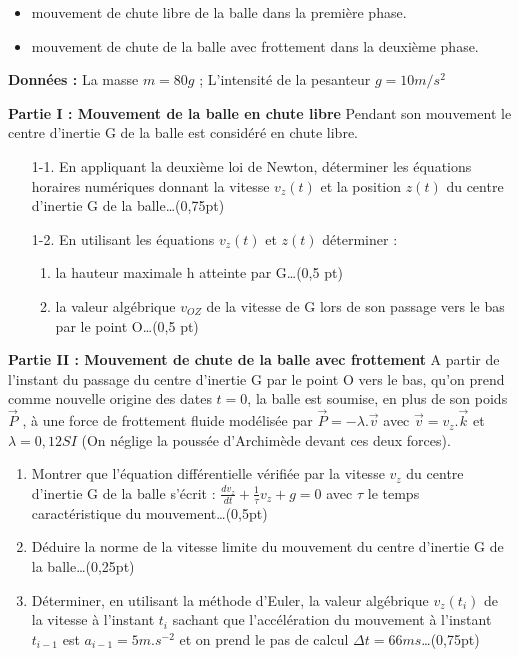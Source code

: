 \documentclass[12pt]{article}
\begin{document}
\begin{itemize}
  \item mouvement de chute libre de la balle dans la première phase.
  \item mouvement de chute de la balle avec frottement dans la deuxième phase.
\end{itemize}

\textbf{Données : }La masse $m = 80g$ ; L’intensité de la pesanteur $g = 10 m/s^2$

\textbf{Partie I : Mouvement de la balle en chute libre}
Pendant son mouvement le centre d’inertie G de la balle est considéré en chute libre.

\begin{enumerate}
  \item[1-1.] En appliquant la deuxième loi de Newton, déterminer les équations horaires
   numériques donnant la vitesse $v_z(t)$ et la position $z(t)$ du centre d'inertie G de la balle\dots(0,75pt)

  \item[1-2.] En utilisant les équations $v_z(t)$ et $z(t)$ déterminer :
    \begin{enumerate}
      \item la hauteur maximale h atteinte par G\dots(0,5 pt)
      \item la valeur algébrique $v_{OZ}$ de la vitesse de G lors de son passage vers le bas par le point O\dots(0,5 pt)
    \end{enumerate}
\end{enumerate}

\textbf{Partie II : Mouvement de chute de la balle avec frottement}
A partir de l’instant du passage du centre d’inertie G par le point O vers le bas, qu’on prend comme
nouvelle origine des dates $t = 0$, la balle est soumise, en plus de son poids $\vec{P}$ , à une force de frottement fluide modélisée par $\vec{P} = -\lambda.\vec{v}$ avec $\vec{v} = v_z.\vec{k}$ et $\lambda = 0,12SI$ (On néglige la poussée d’Archimède devant ces deux forces).
\begin{enumerate}
  \item Montrer que l’équation différentielle vérifiée par la vitesse $v_z$ du centre d’inertie G de la balle s’écrit : $\frac{dv_z}{dt} + \frac{1}{\tau}v_z + g = 0$ avec $\tau$ le temps caractéristique du mouvement\dots(0,5pt)
  \item Déduire la norme de la vitesse limite du mouvement du centre d’inertie G de la balle\dots(0,25pt)
  \item Déterminer, en utilisant la méthode d’Euler, la valeur algébrique $v_z(t_i)$ de la vitesse à l’instant $t_i$ sachant que l’accélération du mouvement à l’instant $t_{i - 1}$ est $a_{i-1} = 5m.s^{-2}$ et on prend le pas de calcul $\Delta{t} = 66ms$\dots(0,75pt)
\end{enumerate}
\end{document}
